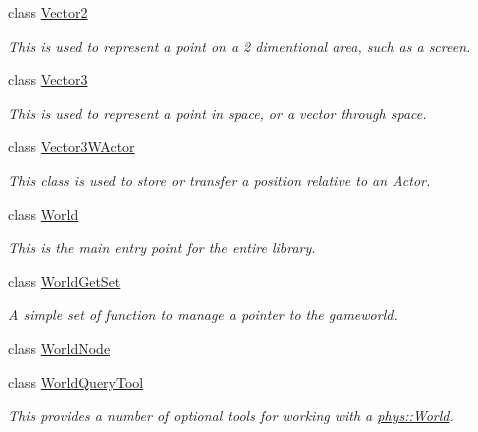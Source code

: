 \begin{DoxyCompactItemize}
class \hyperlink{classphys_1_1Vector2}{Vector2}
\begin{DoxyCompactList}\small\item\em This is used to represent a point on a 2 dimentional area, such as a screen. \item\end{DoxyCompactList}\item 
class \hyperlink{classphys_1_1Vector3}{Vector3}
\begin{DoxyCompactList}\small\item\em This is used to represent a point in space, or a vector through space. \item\end{DoxyCompactList}\item 
class \hyperlink{classphys_1_1Vector3WActor}{Vector3WActor}
\begin{DoxyCompactList}\small\item\em This class is used to store or transfer a position relative to an Actor. \item\end{DoxyCompactList}\item 
class \hyperlink{classphys_1_1World}{World}
\begin{DoxyCompactList}\small\item\em This is the main entry point for the entire library. \item\end{DoxyCompactList}\item 
class \hyperlink{classphys_1_1WorldGetSet}{WorldGetSet}
\begin{DoxyCompactList}\small\item\em A simple set of function to manage a pointer to the gameworld. \item\end{DoxyCompactList}\item 
class \hyperlink{classphys_1_1WorldNode}{WorldNode}
\item 
class \hyperlink{classphys_1_1WorldQueryTool}{WorldQueryTool}
\begin{DoxyCompactList}\small\item\em This provides a number of optional tools for working with a \hyperlink{classphys_1_1World}{phys::World}. \item\end{DoxyCompactList}\end{DoxyCompactItemize}
